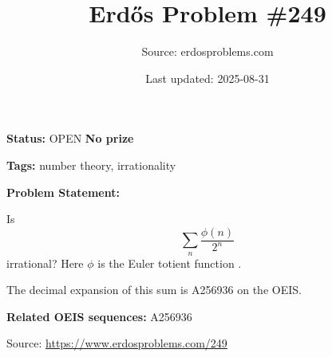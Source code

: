 \documentclass{article}
\title{Erd\H{o}s Problem \#249}
\date{Last updated: 2025-08-31}
\author{Source: erdosproblems.com}
\begin{document}
\maketitle

\noindent\textbf{Status:} OPEN \quad \textbf{No prize}

\noindent\textbf{Tags:} number theory, irrationality

\medskip

\noindent\textbf{Problem Statement:}

Is\[\sum_n \frac{\phi(n)}{2^n}\]irrational? Here $\phi$ is the Euler totient function .




The decimal expansion of this sum is A256936 on the OEIS.

\noindent\textbf{Related OEIS sequences:} A256936


\bigskip
\noindent\small{Source: \url{https://www.erdosproblems.com/249}}
\end{document}
